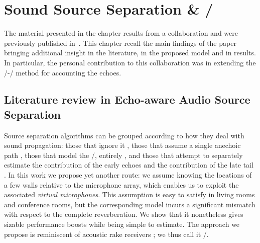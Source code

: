 \chapter{Sound Source Separation \& \SEPARAKEdef/}\label{chap:separake}

 \synopsisChSeparake

\mynewline
The material presented in the chapter results from a collaboration and were previously published in~\cite{scheibler2018separake}.
This chapter recall the main findings of the paper bringing additional insight in the literature, in the proposed model and in results.
In particular, the personal contribution to this collaboration was in extending the \EMdef/-\NMF/ method for accounting the echoes.

\section{Literature review in Echo-aware Audio Source Separation}
Source separation algorithms can be grouped according to how they deal with sound propagation:
those that ignore it , those that assume a single anechoic path ,
those that model the \RTFs/, entirely ,
and those that attempt to separately estimate the contribution of the early echoes and the contribution of the late tail .
In this work we propose yet another route: we assume knowing the locations of a few walls relative to the microphone array, which enables us to exploit the associated \textit{virtual microphones}.
This assumption is easy to satisfy in living rooms and conference rooms, but the corresponding model incurs a significant mismatch with respect to the complete reverberation.
We show that it nonetheless gives sizable performance boosts while being simple to estimate.
The approach we propose is reminiscent of acoustic rake receivers ; we thus call it \SEPARAKEdef/.

